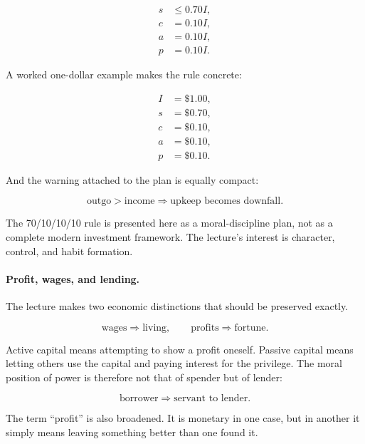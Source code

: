 \begin{align}
s &\leq 0.70I, \\
c &= 0.10I, \\
a &= 0.10I, \\
p &= 0.10I.
\end{align}

A worked one-dollar example makes the rule concrete:

\begin{align}
I &= \$1.00, \\
s &= \$0.70, \\
c &= \$0.10, \\
a &= \$0.10, \\
p &= \$0.10.
\end{align}

And the warning attached to the plan is equally compact:

\begin{equation}
\text{outgo}>\text{income}\Rightarrow \text{upkeep becomes downfall}.
\end{equation}

\begin{remark}
The 70/10/10/10 rule is presented here as a moral-discipline plan, not as a complete modern investment framework. The lecture's interest is character, control, and habit formation.
\end{remark}

\paragraph{Profit, wages, and lending.}
The lecture makes two economic distinctions that should be preserved exactly.

\begin{equation}
\text{wages}\Rightarrow \text{living}, \qquad \text{profits}\Rightarrow \text{fortune}.
\end{equation}

Active capital means attempting to show a profit oneself. Passive capital means letting others use the capital and paying interest for the privilege. The moral position of power is therefore not that of spender but of lender:

\begin{equation}
\text{borrower}\Rightarrow \text{servant to lender}.
\end{equation}

The term ``profit'' is also broadened. It is monetary in one case, but in another it simply means leaving something better than one found it.

